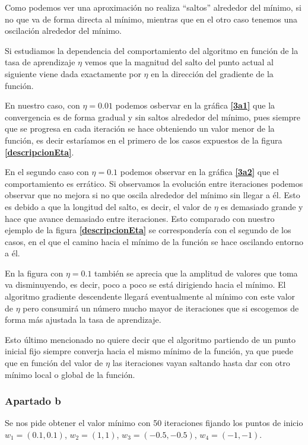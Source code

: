 \documentclass[12pt,a4paper]{article}
\begin{document}
Como podemos ver una aproximación no realiza ``saltos'' alrededor del mínimo, si no que va de forma directa al mínimo, mientras que en el otro caso tenemos una oscilación alrededor del mínimo. 

Si estudiamos la dependencia del comportamiento del algoritmo en función de la tasa de aprendizaje $\eta$ vemos que la magnitud del salto del punto actual al siguiente viene dada exactamente por $\eta$ en la dirección del gradiente de la función.

En nuestro caso, con $\eta = 0.01$ podemos osbervar en la gráfica \textbf{\ref{3a1}} que la convergencia es de forma gradual y sin saltos alrededor del mínimo, pues siempre que se progresa en cada iteración se hace obteniendo un valor menor de la función, es decir estaríamos en el primero de los casos expuestos de la figura \textbf{\ref{descripcionEta}}.

En el segundo caso con $\eta=0.1$ podemos observar en la gráfica \textbf{\ref{3a2}} que el comportamiento es errático. Si observamos la evolución entre iteraciones podemos observar que no mejora si no que oscila alrededor del mínimo sin llegar a él. Esto es debido a que la longitud del salto, es decir, el valor de $\eta$ es demasiado grande y hace que avance demasiado entre iteraciones. Esto comparado con nuestro ejemplo de la figura \textbf{\ref{descripcionEta}} se correspondería con el segundo de los casos, en el que el camino hacia el mínimo de la función se hace oscilando entorno a él.

En la figura con $\eta=0.1$ también se aprecia que la amplitud de valores que toma va disminuyendo, es decir, poco a poco se está dirigiendo hacia el mínimo. El algoritmo gradiente descendente llegará eventualmente al mínimo con este valor de $\eta$ pero consumirá un número mucho mayor de iteraciones que si escogemos de forma más ajustada la tasa de aprendizaje.

Esto último mencionado no quiere decir que el algoritmo partiendo de un punto inicial fijo siempre converja hacia el mismo mínimo de la función, ya que puede que en función del valor de $\eta$ las iteraciones vayan saltando hasta dar con otro mínimo local o global de la función.

\subsubsection{Apartado b}

Se nos pide obtener el valor mínimo con 50 iteraciones fijando los puntos de inicio $w_1 = (0.1,0.1)$, $w_2 = (1,1)$, $w_3 = (-0.5,-0.5)$, $w_4 = (-1,-1)$.
\end{document}
